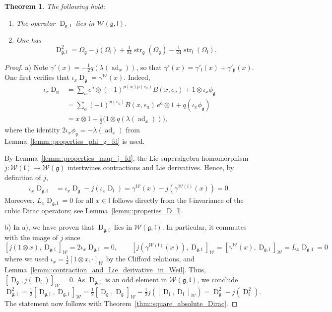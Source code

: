\documentclass[11pt]{amsart}
\newcommand{\str}{\operatorname{str}}
\newcommand{\ad}{\operatorname{ad}}
\newcommand{\Dirac}{\operatorname{D}}
\def\WW{{\mathcal{W}}}
\def\pp{{\mathfrak p}}
\def\ll{{\mathfrak l}}
\def\pp{{\mathfrak p}}
\def\pp{{\mathfrak{p}}}
\def\gg{{\mathfrak{g}}}
\theoremstyle{plain}
\newtheorem{theorem}{Theorem}
\theoremstyle{remark}
\theoremstyle{definition}
\numberwithin{equation}{section}
\theoremstyle{remark}
\begin{document}
\begin{theorem}\label{thm::square_Dirac_fd} The following hold:
\begin{enumerate}
\item[a)] The operator $\Dirac_{\gg,\ll}$ lies in $\WW(\gg,\ll)$.
\item[b)] One has
\[
\Dirac_{\gg,\ll}^{2}
=\Omega_{\gg}-j(\Omega_{\ll})
+\tfrac{1}{24}\str_{\gg}(\Omega_{\gg})
-\tfrac{1}{24}\str_{\ll}(\Omega_{\ll}).
\]
\end{enumerate}
\end{theorem}

\begin{proof}
 a) Note $\gamma'(x)=-\tfrac{1}{2}q(\lambda(\ad_{x}))$, so that $\gamma'(x)=\gamma'_{\ll}(x)+\gamma'_{\pp}(x)$. One first verifies that
$
\iota_{x}\Dirac_{\gg}=\gamma^{\WW}(x).
$
Indeed,
\[
\begin{aligned}
\iota_{x}\Dirac_{\gg}
&=\sum_{a}e^{a}\otimes(-1)^{p(x)p(e_{a})}B(x,e_{a})
+1\otimes\iota_{x}\phi_{\gg}\\
&=\sum_{a}(-1)^{p(e_{a})}B(x,e_{a})\,e^{a}\otimes1
+q(\iota_{x}\phi_{\gg})\\
&=x\otimes1-\tfrac{1}{2}\bigl(1\otimes q(\lambda(\ad_{x}))\bigr),
\end{aligned}
\]
where the identity $2\iota_{x}\phi_{\gg}=-\lambda(\ad_{x})$ from Lemma~\ref{lemm::properties_phi_g_fd} is used.

By Lemma~\ref{lemm::properties_map_j_fd}, the Lie superalgebra homomorphism
$j\colon\mathcal{W}(\ll)\to\mathcal{W}(\gg)$ intertwines contractions and Lie derivatives. Hence, by definition of $j$,
\[
\begin{aligned}
\iota_{x}\Dirac_{\gg,\ll}
&=\iota_{x}\Dirac_{\gg}-j(\iota_{x}\Dirac_{\ll})=\gamma^{\WW}(x)-j(\gamma^{\WW(\ll)}(x))=0.
\end{aligned}
\]
Moreover, $L_{x}\Dirac_{\gg,\ll}=0$ for all $x\in\ll$ follows directly from the $\ll$-invariance of the cubic Dirac operators; see Lemma~\ref{lemm::properies_D_l}.

 
 b) In a), we have proven that $\Dirac_{\gg,\ll}$ lies in $\mathcal{W}(\gg,\ll)$. In particular, it commutes with the image of $j$ since 
 \[
[j(1\otimes x),\Dirac_{\gg,\ll}]_{\WW}=2\iota_{x}\Dirac_{\gg,\ll}=0, \qquad [j(\gamma^{\WW(\ll)}(x)),\Dirac_{\gg,\ll}]_{\WW}=[\gamma^{\WW}(x), \Dirac_{\gg,\ll}]_{\WW}=L_{x} \Dirac_{\gg,\ll}=0
 \]
where we used $\iota_{x}=\tfrac{1}{2}[1\otimes x,\cdot]_{\WW}$ by the Clifford relations, and Lemma~\ref{lemm::contraction_and_Lie_derivative_in_Weil}.
Thus, $[\Dirac_{\gg}, j(\Dirac_{\ll})]_{\WW}=0$. As $\Dirac_{\gg,\ll}$ is an odd element in $\mathcal{W}(\gg,\ll)$, we conclude 
 \[
 \Dirac_{\gg,\ll}^{2}=\tfrac{1}{2}[\Dirac_{\gg,\ll}, \Dirac_{\gg,\ll}]_{\WW}=\tfrac{1}{2}[\Dirac_{\gg}, \Dirac_{\gg}]_{\WW}-\tfrac{1}{2}j([\Dirac_{\ll},\Dirac_{\ll}]_{\WW})=\Dirac_{\gg}^{2}-j(\Dirac_{\ll}^{2}). 
 \]
 The statement now follows with Theorem~\ref{thm::square_absolute_Dirac}.
\end{proof}
\end{document}
